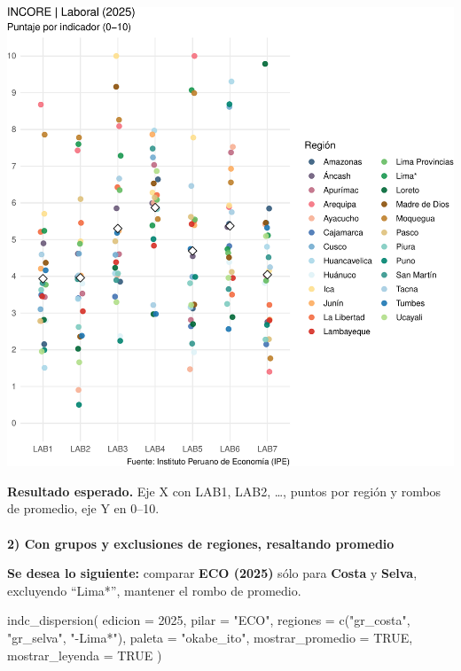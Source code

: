 \documentclass[
  11pt,
  letterpaper,
  DIV=11,
  numbers=noendperiod]{scrartcl}
\makeatletter
\let\oldparagraph\paragraph
\renewcommand{\paragraph}{
    \@ifstar
      \xxxParagraphStar
      \xxxParagraphNoStar
  }
\newcommand{\xxxParagraphStar}[1]{\oldparagraph*{#1}\mbox{}}
\newcommand{\xxxParagraphNoStar}[1]{\oldparagraph{#1}\mbox{}}
\newenvironment{Shaded}{\begin{snugshade}}{\end{snugshade}}
\newcommand{\AttributeTok}[1]{\textcolor[rgb]{0.40,0.45,0.13}{#1}}
\newcommand{\ConstantTok}[1]{\textcolor[rgb]{0.56,0.35,0.01}{#1}}
\newcommand{\DecValTok}[1]{\textcolor[rgb]{0.68,0.00,0.00}{#1}}
\newcommand{\FunctionTok}[1]{\textcolor[rgb]{0.28,0.35,0.67}{#1}}
\newcommand{\NormalTok}[1]{\textcolor[rgb]{0.00,0.23,0.31}{#1}}
\newcommand{\StringTok}[1]{\textcolor[rgb]{0.13,0.47,0.30}{#1}}
\makeatother
\begin{document}
\includegraphics{Manual_files/figure-pdf/unnamed-chunk-88-1.pdf}

\textbf{Resultado esperado.} Eje X con LAB1, LAB2, \ldots, puntos por
región y rombos de promedio, eje Y en 0--10.

\paragraph{\texorpdfstring{\textbf{2) Con grupos y exclusiones de
regiones, resaltando
promedio}}{2) Con grupos y exclusiones de regiones, resaltando promedio}}\label{con-grupos-y-exclusiones-de-regiones-resaltando-promedio}

\textbf{Se desea lo siguiente:} comparar \textbf{ECO (2025)} sólo para
\textbf{Costa} y \textbf{Selva}, excluyendo ``Lima*'', mantener el rombo
de promedio.

\begin{Shaded}
\begin{Highlighting}[]
\FunctionTok{indc\_dispersion}\NormalTok{(}
  \AttributeTok{edicion          =} \DecValTok{2025}\NormalTok{,}
  \AttributeTok{pilar            =} \StringTok{"ECO"}\NormalTok{,}
  \AttributeTok{regiones         =} \FunctionTok{c}\NormalTok{(}\StringTok{"gr\_costa"}\NormalTok{, }\StringTok{"gr\_selva"}\NormalTok{, }\StringTok{"{-}Lima*"}\NormalTok{),}
  \AttributeTok{paleta           =} \StringTok{"okabe\_ito"}\NormalTok{,}
  \AttributeTok{mostrar\_promedio =} \ConstantTok{TRUE}\NormalTok{,}
  \AttributeTok{mostrar\_leyenda  =} \ConstantTok{TRUE}
\NormalTok{)}
\end{Highlighting}
\end{Shaded}
\end{document}
